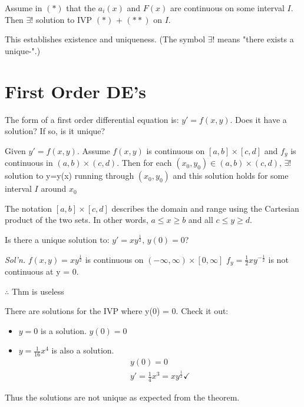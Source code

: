 \documentclass[../main.tex]{subfiles}
\begin{document}
\begin{theorem}[]
    Assume in \( (*) \) that the \(a_{i}(x) \) and \( F(x) \) are continuous on some interval \( I
     \).
    Then \( \exists ! \) solution to IVP \( (*) \) + \( (**) \) on \( I \).

    \begin{note}
        This establishes existence and uniqueness. (The symbol \( \exists ! \) means "there exists a unique-".)
    \end{note}
\end{theorem}


\section{First Order DE's}

The form of a first order differential equation is: \( y' = f(x,y) \). Does it have a solution? If so, is it unique?

\begin{theorem}[]
    Given \( y'=f(x,y) \). Assume \( f(x,y) \) is continuous on \( [a,b] \times [c,d] \) and \( f_{y} \) is continuous in \( (a,b) \times (c,d) \).
    Then for each \( (x_0,y_0) \in (a,b) \times (c,d),\, \exists ! \) solution to y=y(x) running through \( (x_0,y_0) \) and this solution holds for some interval \( I \) around \( x_0 \)
    
    \begin{note}
        The notation \( [a,b] \times [c,d] \) describes the domain and range using the Cartesian product of the two sets. In other words, \(a \leq x \geq b \) and all \( c \leq y \geq d \).
    \end{note}
\end{theorem}

\begin{example}[]
    Is there a unique solution to: \( y'=xy^{\frac{1}{2}},\,y(0)=0 \)?

    \textit{Sol'n.}
    \( f(x,y)=xy^{\frac{1}{2}} \) is continuous on \( (-\infty,\infty)\times[0,\infty] \)
    \( f_y = \frac{1}{2}xy^{-\frac{1}{2}} \) is not continuous at y = 0.
    
    \( \therefore \) Thm is useless

    There are solutions for the IVP where y(0) = 0. Check it out:
    \begin{itemize}[mode=unboxed]
        \item \( y=0 \) is a solution. \( y(0) = 0 \)
        \item \( y=\frac{1}{16}x^4 \) is also a solution.
            \begin{gather*}
                y(0) = 0 \\
                y'=\frac{1}{4}x^3=xy^{\frac{1}{2}} \checkmark
            \end{gather*}
    \end{itemize}
    Thus the solutions are not unique as expected from the theorem.
\end{example}
\end{document}
